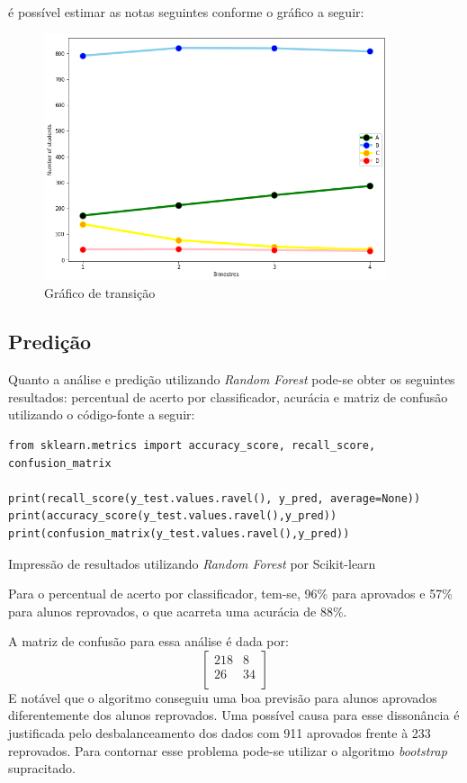 \documentclass{article}
\begin{document}
é possível estimar as notas seguintes conforme o gráfico a seguir:

\begin{figure}[H]
\centering
\includegraphics[width=0.9\textwidth]{graf.png}
\caption{Gráfico de transição}
\label{graf}
\end{figure}

\subsection{Predição}

Quanto a análise e predição utilizando \emph{Random Forest} pode-se obter os seguintes resultados: percentual de acerto por classificador, acurácia e matriz de confusão utilizando o código-fonte a seguir: 

\begin{listing}[H]
\begin{verbatim}
from sklearn.metrics import accuracy_score, recall_score, confusion_matrix

print(recall_score(y_test.values.ravel(), y_pred, average=None))
print(accuracy_score(y_test.values.ravel(),y_pred))
print(confusion_matrix(y_test.values.ravel(),y_pred))
\end{verbatim}
\caption{Impressão de resultados utilizando \emph{Random Forest} por Scikit-learn}
\end{listing}

Para o percentual de acerto por classificador, tem-se, 96\% para aprovados e 57\% para alunos reprovados, o que acarreta uma acurácia de 88\%.

A matriz de confusão para essa análise é dada por:
\[
\begin{bmatrix}
    218 & 8 \\
    26 & 34 \\
\end{bmatrix} 
\]
E notável que o algoritmo conseguiu uma boa previsão para alunos aprovados diferentemente dos alunos reprovados. Uma possível causa para esse dissonância é justificada pelo desbalanceamento dos dados com 911 aprovados frente à 233 reprovados. Para contornar esse problema pode-se utilizar o algoritmo  \emph{bootstrap} supracitado.



 
\end{document}
